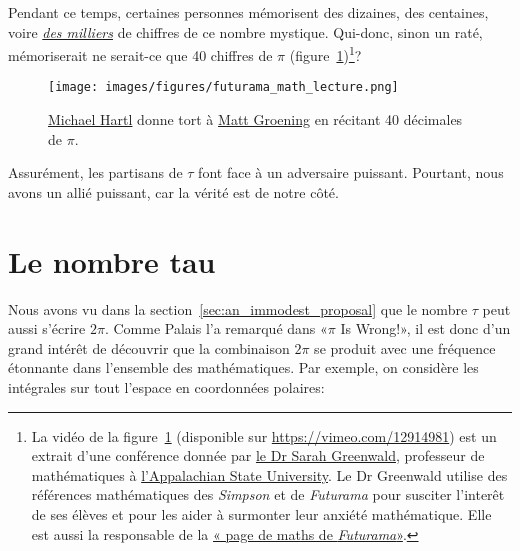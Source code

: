 Pendant ce temps, certaines personnes mémorisent des dizaines, des centaines,
voire
\href{https://translate.google.com/translate?sl=en&tl=fr&u=https://www.guinnessworldrecords.com/world-records/most-pi-places-memorised}{\emph{des
milliers}} de chiffres de ce nombre mystique. Qui-donc, sinon un raté, mémoriserait ne serait-ce
que 40 chiffres de $\pi$ (figure~\ref{fig:futurama_video})\ns\footnote{La vidéo de la
figure~\ref{fig:futurama_video} (disponible sur
\url{https://vimeo.com/12914981}) est un extrait d'une conférence donnée par
\href{https://translate.google.com/translate?sl=en&tl=fr&u=https://cs.appstate.edu/~sjg/}{le Dr Sarah
Greenwald}, professeur de
mathématiques à \href{https://www.appstate.edu/}{l'Appalachian State
University}. Le Dr Greenwald utilise des références mathématiques des
\emph{Simpson} et de \emph{Futurama} pour susciter l'interêt de ses élèves et
pour les aider à surmonter leur anxiété mathématique. Elle est aussi la
responsable de la
\href{https://translate.google.com/translate?sl=en&tl=fr&u=https://cs.appstate.edu/~sjg/futurama/}{«\ns
page de maths de \emph{Futurama}\ns »}.}\ns?

\begin{figure}
\begin{center}
\texttt{[image: images/figures/futurama\_math\_lecture.png]} %
\end{center}
\caption{\href{https://tauday.com/le-manifeste-de-tau/\#sec-about_the_author}{Michael
Hartl} donne tort à \href{https://fr.wikipedia.org/wiki/Matt_Groening}{Matt
Groening} en récitant 40 décimales de $\pi$.\label{fig:futurama_video}}
\end{figure}

Assurément, les partisans de $\tau$ font face à un adversaire puissant.
Pourtant, nous avons un allié puissant, car la vérité est de notre côté.


\section{Le nombre tau} %
\label{sec:the_number_tau}

Nous avons vu dans la section~\ref{sec:an_immodest_proposal} que le nombre $\tau$ peut aussi s'écrire
$2\pi$. Comme Palais l'a remarqué dans «\ns $\pi$ Is Wrong!\ns », il est donc d'un grand
intérêt de découvrir que la combinaison $2\pi$ se produit avec une fréquence
étonnante dans l'ensemble des mathématiques. Par exemple, on considère les
intégrales sur tout l'espace en coordonnées polaires:


